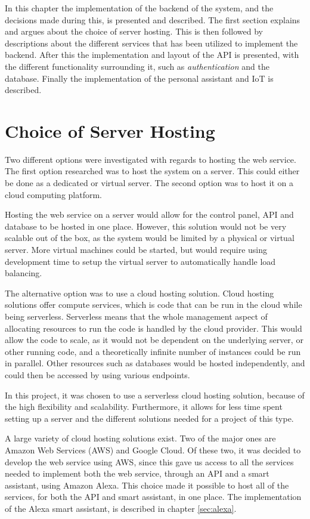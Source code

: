 In this chapter the implementation of the backend of the system, and the decisions made during this, is presented and described. The first section explains and argues about the choice of server hosting. This is then followed by descriptions about the different services that has been utilized to implement the backend. After this the implementation and layout of the API is presented, with the different functionality surrounding it, such as \textit{authentication} and the database. Finally the implementation of the personal assistant and IoT is described. 

\section{Choice of Server Hosting}\label{sec:server-choice}
Two different options were investigated with regards to hosting the web service. The first option researched was to host the system on a server. This could either be done as a dedicated or virtual server. The second option was to host it on a cloud computing platform.

Hosting the web service on a server would allow for the control panel, API and database to be hosted in one place. However, this solution would not be very scalable out of the box, as the system would be limited by a physical or virtual server. More virtual machines could be started, but would require using development time to setup the virtual server to automatically handle load balancing.

The alternative option was to use a cloud hosting solution. Cloud hosting solutions offer compute services, which is code that can be run in the cloud while being serverless. Serverless means that the whole management aspect of allocating resources to run the code is handled by the cloud provider. This would allow the code to scale, as it would not be dependent on the underlying server, or other running code, and a theoretically infinite number of instances could be run in parallel. Other resources such as databases would be hosted independently, and could then be accessed by using various endpoints.

In this project, it was chosen to use a serverless cloud hosting solution, because of the high flexibility and scalability. Furthermore, it allows for less time spent setting up a server and the different solutions needed for a project of this type.

A large variety of cloud hosting solutions exist. Two of the major ones are Amazon Web Services (AWS) and Google Cloud. Of these two, it was decided to develop the web service using AWS, since this gave us access to all the services needed to implement both the web service, through an API and a smart assistant, using Amazon Alexa. This choice made it possible to host all of the services, for both the API and smart assistant, in one place. The implementation of the Alexa smart assistant, is described in chapter \ref{sec:alexa}.

